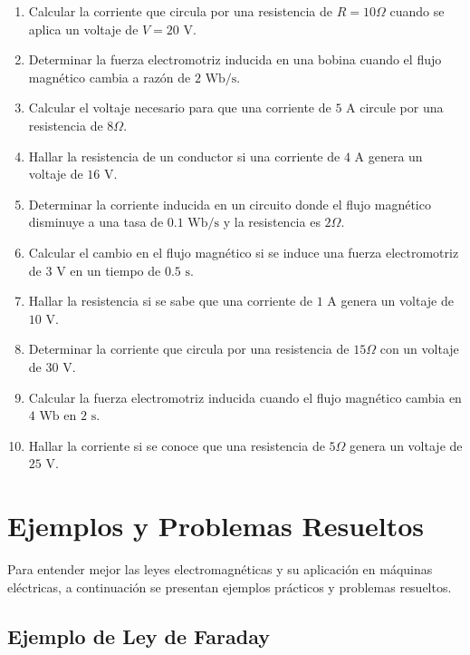 \documentclass[../main]{subfiles}
\begin{document}
\begin{enumerate}
    \item Calcular la corriente que circula por una resistencia de \(R = 10 \Omega\) cuando se aplica un voltaje de \(V = 20 \text{ V}\).
    \item Determinar la fuerza electromotriz inducida en una bobina cuando el flujo magnético cambia a razón de \(2 \text{ Wb/s}\).
    \item Calcular el voltaje necesario para que una corriente de \(5 \text{ A}\) circule por una resistencia de \(8 \Omega\).
    \item Hallar la resistencia de un conductor si una corriente de \(4 \text{ A}\) genera un voltaje de \(16 \text{ V}\).
    \item Determinar la corriente inducida en un circuito donde el flujo magnético disminuye a una tasa de \(0.1 \text{ Wb/s}\) y la resistencia es \(2 \Omega\).
    \item Calcular el cambio en el flujo magnético si se induce una fuerza electromotriz de \(3 \text{ V}\) en un tiempo de \(0.5 \text{ s}\).
    \item Hallar la resistencia si se sabe que una corriente de \(1 \text{ A}\) genera un voltaje de \(10 \text{ V}\).
    \item Determinar la corriente que circula por una resistencia de \(15 \Omega\) con un voltaje de \(30 \text{ V}\).
    \item Calcular la fuerza electromotriz inducida cuando el flujo magnético cambia en \(4 \text{ Wb}\) en \(2 \text{ s}\).
    \item Hallar la corriente si se conoce que una resistencia de \(5 \Omega\) genera un voltaje de \(25 \text{ V}\).
\end{enumerate}



\section{Ejemplos y Problemas Resueltos}

Para entender mejor las leyes electromagnéticas y su aplicación en máquinas eléctricas, a continuación se presentan ejemplos prácticos y problemas resueltos.

\subsection{Ejemplo de Ley de Faraday}
\end{document}
